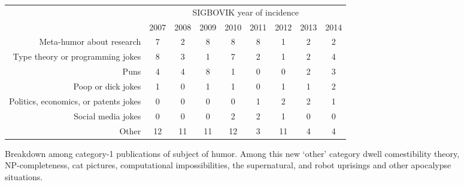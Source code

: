 \documentclass[12pt]{article}
\begin{document}
\thispagestyle{empty}
\begin{figure}[h]
\begin{center}
\begin{tabular}{r|c|c|c|c|c|c|c|c|}
& \multicolumn{8}{c|}{SIGBOVIK year of incidence} \\
& 2007 & 2008 & 2009 & 2010 & 2011 & 2012 & 2013 & 2014 \\
\hline
\hline
Meta-humor about research
& 7  & 2  & 8  & 8  & 8  & 1  & 2  & 2  \\ \hline
Type theory or programming jokes
& 8  & 3  & 1  & 7  & 2  & 1  & 2  & 4  \\ \hline
Puns
& 4  & 4  & 8  & 1  & 0  & 0  & 2  & 3  \\ \hline
Poop or dick jokes
& 1  & 0  & 1  & 1  & 0  & 1  & 1  & 2  \\ \hline
Politics, economics, or patents jokes
& 0  & 0  & 0  & 0  & 1  & 2  & 2  & 1  \\ \hline
Social media jokes
& 0  & 0  & 0  & 2  & 2  & 1  & 0  & 0  \\ \hline
Other
& 12 & 11 & 11 & 12 & 3  & 11 & 4  & 4  \\ \hline

\end{tabular}
\end{center}
\caption{Breakdown among category-1 publications of subject of humor. Among this new `other' category dwell comestibility theory, NP-completeness, cat pictures, computational impossibilities, the supernatural, and robot uprisings and other apocalypse situations.}
\label{fig:results2}
\end{figure}
\end{document}
